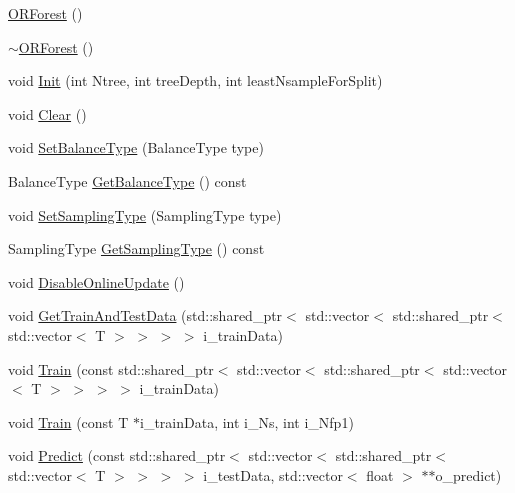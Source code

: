 \begin{DoxyCompactItemize}
\item 
\hyperlink{class_random_forest_1_1_o_r_forest_a970fb124452965dc744e967845991048}{O\+R\+Forest} ()
\item 
\hyperlink{class_random_forest_1_1_o_r_forest_a000d2832b0a69043208119976d89d1cc}{$\sim$\+O\+R\+Forest} ()
\item 
void \hyperlink{class_random_forest_1_1_o_r_forest_a52fb96dc5c407c929b6aad07dc0aa0d7}{Init} (int Ntree, int tree\+Depth, int least\+Nsample\+For\+Split)
\item 
void \hyperlink{class_random_forest_1_1_o_r_forest_a08714e0dde73bbceb75fd81bdf34961a}{Clear} ()
\item 
void \hyperlink{class_random_forest_1_1_o_r_forest_a5894ca367569e0c0f0048d388cfbbc13}{Set\+Balance\+Type} (Balance\+Type type)
\item 
Balance\+Type \hyperlink{class_random_forest_1_1_o_r_forest_ad41da1786cff19a7976c79933d1021fa}{Get\+Balance\+Type} () const 
\item 
void \hyperlink{class_random_forest_1_1_o_r_forest_a2a118fd19305941ec9d8622fffa31f55}{Set\+Sampling\+Type} (Sampling\+Type type)
\item 
Sampling\+Type \hyperlink{class_random_forest_1_1_o_r_forest_a434008e6cf7d89966e237c39dff87c0a}{Get\+Sampling\+Type} () const 
\item 
void \hyperlink{class_random_forest_1_1_o_r_forest_a6523f13de8fe3a05f83863d9a21d0e57}{Disable\+Online\+Update} ()
\item 
void \hyperlink{class_random_forest_1_1_o_r_forest_a07eb95bf23556e48c736c65c0b85a3b3}{Get\+Train\+And\+Test\+Data} (std\+::shared\+\_\+ptr$<$ std\+::vector$<$ std\+::shared\+\_\+ptr$<$ std\+::vector$<$ T $>$ $>$ $>$ $>$ i\+\_\+train\+Data)
\item 
void \hyperlink{class_random_forest_1_1_o_r_forest_a24d7835d66a8c5f275952d941359f8b2}{Train} (const std\+::shared\+\_\+ptr$<$ std\+::vector$<$ std\+::shared\+\_\+ptr$<$ std\+::vector$<$ T $>$ $>$ $>$ $>$ i\+\_\+train\+Data)
\item 
void \hyperlink{class_random_forest_1_1_o_r_forest_a563f5efa7e4dbdc0a29d50b9dc0751ff}{Train} (const T $\ast$i\+\_\+train\+Data, int i\+\_\+\+Ns, int i\+\_\+\+Nfp1)
\item 
void \hyperlink{class_random_forest_1_1_o_r_forest_a2b9cb16f3727b0209e5cd085b73fa32c}{Predict} (const std\+::shared\+\_\+ptr$<$ std\+::vector$<$ std\+::shared\+\_\+ptr$<$ std\+::vector$<$ T $>$ $>$ $>$ $>$ i\+\_\+test\+Data, std\+::vector$<$ float $>$ $\ast$$\ast$o\+\_\+predict)
$$
\end{DoxyCompactItemize}

